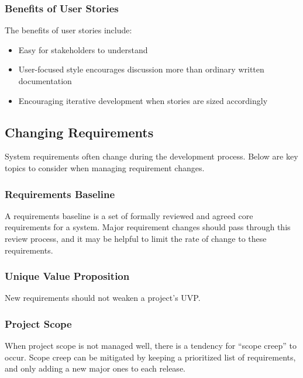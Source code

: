 \documentclass[12pt,titlepage]{article}
\begin{document}
        \subsubsection{Benefits of User Stories}
          The benefits of user stories include:
          \begin{itemize}
            \item Easy for stakeholders to understand
            \item User-focused style encourages discussion more than ordinary written documentation
            \item Encouraging iterative development when stories are sized accordingly
          \end{itemize}

      \subsection{Changing Requirements}
        System requirements often change during the development process. Below are key topics to consider when managing requirement changes.

        \subsubsection{Requirements Baseline}
          A requirements baseline is a set of formally reviewed and agreed core requirements for a system. Major requirement changes should pass
          through this review process, and it may be helpful to limit the rate of change to these requirements.

        \subsubsection{Unique Value Proposition}
          New requirements should not weaken a project's UVP.

        \subsubsection{Project Scope}
          When project scope is not managed well, there is a tendency for ``scope creep'' to occur. Scope creep can be mitigated by keeping a
          prioritized list of requirements, and only adding a new major ones to each release.
\end{document}
